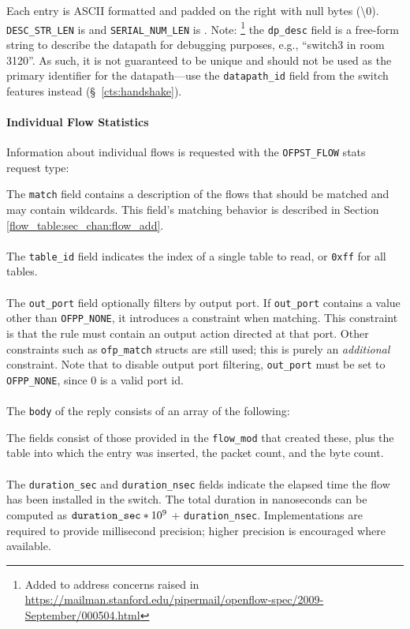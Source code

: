 
Each entry is ASCII formatted and padded on the right with null bytes (\textbackslash0).  \verb|DESC_STR_LEN| is and \verb|SERIAL_NUM_LEN| is .  Note: \footnote{Added to address concerns raised in \url{https://mailman.stanford.edu/pipermail/openflow-spec/2009-September/000504.html}} the \verb|dp_desc| field is a free-form string to describe the datapath for debugging purposes, e.g., ``switch3 in room 3120''.  As such, it is not guaranteed to be unique and should not be used as the primary identifier for the datapath---use the \verb|datapath_id| field from the switch features instead (\S~\ref{cts:handshake}).

\paragraph{Individual Flow Statistics}
Information about individual flows is requested with the \verb|OFPST_FLOW| stats request type:


The \verb|match| field contains a description of the flows that should be matched and may contain wildcards.  This field's matching behavior is described in Section \ref{flow_table:sec_chan:flow_add}.
\\\\
The \verb|table_id| field indicates the index of a single table to read, or \verb|0xff| for all tables.
\\\\
The \verb|out_port| field optionally filters by output port.  If \verb|out_port| contains a value other than \verb|OFPP_NONE|, it introduces a constraint when matching.  This constraint is that the rule must contain an output action directed at that port.  Other constraints such as \verb|ofp_match| structs are still used; this is purely an \emph{additional} constraint.  Note that to disable output port filtering, \verb|out_port| must be set to \verb|OFPP_NONE|, since 0 is a valid port id. 
\\\\
The \verb|body| of the reply consists of an array of the following:


The fields consist of those provided in the \verb|flow_mod| that created these, plus the table into which the entry was inserted, the packet count, and the byte count.
\\\\
\label{flow_duration_info}The \verb|duration_sec| and \verb|duration_nsec| fields indicate the elapsed time the flow has been installed in the switch. The total duration in nanoseconds can be computed as $\verb|duration_sec|*10^{9}$ + \verb|duration_nsec|. Implementations are required to provide millisecond precision; higher precision is encouraged where available.

